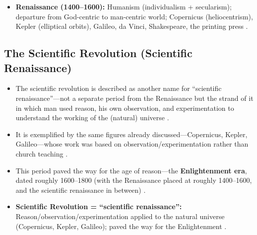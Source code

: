\begin{QuickRevision}
\begin{itemize}
    \item \textbf{Renaissance (1400--1600):} Humanism (individualism + secularism); departure from God-centric to man-centric world; Copernicus (heliocentrism), Kepler (elliptical orbits), Galileo, da Vinci, Shakespeare, the printing press .
\end{itemize}
\end{QuickRevision}

\subsection{The Scientific Revolution (Scientific Renaissance)}

\begin{KeyConcept}
\begin{itemize}
    \item The scientific revolution is described as another name for ``scientific renaissance''---not a separate period from the Renaissance but the strand of it in which man used reason, his own observation, and experimentation to understand the working of the (natural) universe .
    \item It is exemplified by the same figures already discussed---Copernicus, Kepler, Galileo---whose work was based on observation/experimentation rather than church teaching .
\end{itemize}
\end{KeyConcept}

\begin{GovtPolicy}
\begin{itemize}
    \item This period paved the way for the age of reason---the \textbf{Enlightenment era}, dated roughly 1600--1800 (with the Renaissance placed at roughly 1400--1600, and the scientific renaissance in between) .
\end{itemize}
\end{GovtPolicy}

\begin{QuickRevision}
\begin{itemize}
    \item \textbf{Scientific Revolution = ``scientific renaissance'':} Reason/observation/experimentation applied to the natural universe (Copernicus, Kepler, Galileo); paved the way for the Enlightenment .
\end{itemize}
\end{QuickRevision}

